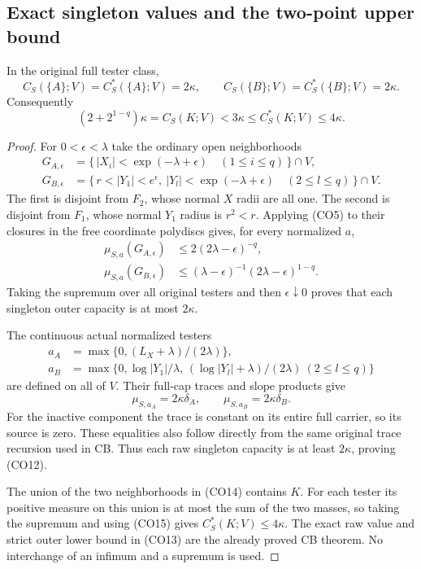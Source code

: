\subsection*{Exact singleton values and the two-point upper bound}

\begin{proposition}
In the original full tester class,
\[
       C_S(\{A\};V)=C_S^*(\{A\};V)=2\kappa,\qquad
       C_S(\{B\};V)=C_S^*(\{B\};V)=2\kappa.
 \tag{CO12}
\]
Consequently
\[
       (2+2^{1-q})\kappa=C_S(K;V)
                    <3\kappa\le C_S^*(K;V)\le4\kappa.
 \tag{CO13}
\]
\end{proposition}

\begin{proof}
For $0<\epsilon<\lambda$ take the ordinary open neighborhoods
\[
 \begin{split}
 G_{A,\epsilon}
   &=\{\,|X_i|<\exp(-\lambda+\epsilon)\quad(1\le i\le q)\,\}
                                                          \cap V,\\
 G_{B,\epsilon}
   &=\{\,r<|Y_1|<e^\epsilon,\ 
          |Y_l|<\exp(-\lambda+\epsilon)\quad(2\le l\le q)\,\}
                                                          \cap V.
 \end{split}
 \tag{CO14}
\]
The first is disjoint from $F_2$, whose normal $X$ radii are
all one. The second is disjoint from $F_1$, whose normal
$Y_1$ radius is $r^2<r$. Applying (CO5) to their closures
in the free coordinate polydiscs gives, for every normalized $a$,
\[
 \begin{split}
 \mu_{S,a}(G_{A,\epsilon})&\le2(2\lambda-\epsilon)^{-q},\\
 \mu_{S,a}(G_{B,\epsilon})&\le
       (\lambda-\epsilon)^{-1}(2\lambda-\epsilon)^{1-q}.
 \end{split}
 \tag{CO15}
\]
Taking the supremum over all original testers and then
$\epsilon\downarrow0$ proves that each singleton outer capacity
is at most $2\kappa$.

The continuous actual normalized testers
\[
 \begin{split}
 a_A&=\max\{0,(L_X+\lambda)/(2\lambda)\},\\
 a_B&=\max\{0,\log|Y_1|/\lambda,\,
                       (\log|Y_l|+\lambda)/(2\lambda)\ (2\le l\le q)\}
 \end{split}
 \tag{CO16}
\]
are defined on all of $V$. Their full-cap traces and slope
products give
\[
                  \mu_{S,a_A}=2\kappa\delta_A,\qquad
                  \mu_{S,a_B}=2\kappa\delta_B.
 \tag{CO17}
\]
For the inactive component the trace is constant on its
entire full carrier, so its source is zero. These equalities
also follow directly from the same original trace recursion
used in CB. Thus each raw singleton capacity is at least
$2\kappa$, proving (CO12).

The union of the two neighborhoods in (CO14) contains $K$.
For each tester its positive measure on this union is at most
the sum of the two masses, so taking the supremum and using
(CO15) gives $C_S^*(K;V)\le4\kappa$. The exact raw value
and strict outer lower bound in (CO13) are the already proved
CB theorem. No interchange of an infimum and a supremum is used.
\end{proof}

